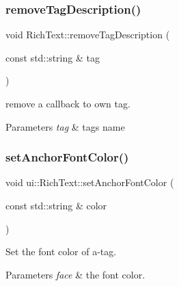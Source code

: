 \subsubsection{\texorpdfstring{remove\+Tag\+Description()}{removeTagDescription()}\hspace{0.1cm}{\footnotesize\ttfamily [2/2]}}
{\footnotesize\ttfamily void Rich\+Text\+::remove\+Tag\+Description (\begin{DoxyParamCaption}\item[{const std\+::string \&}]{tag }\end{DoxyParamCaption})\hspace{0.3cm}{\ttfamily [static]}}



remove a callback to own tag. 


\begin{DoxyParams}{Parameters}
{\em tag} & tag\textquotesingle{}s name \\
\hline
\end{DoxyParams}
\mbox{\label{classui_1_1RichText_a60ebf6b715a3c538ce8a4c77c979b305}} 
\subsubsection{\texorpdfstring{set\+Anchor\+Font\+Color()}{setAnchorFontColor()}\hspace{0.1cm}{\footnotesize\ttfamily [1/2]}}
{\footnotesize\ttfamily void ui\+::\+Rich\+Text\+::set\+Anchor\+Font\+Color (\begin{DoxyParamCaption}\item[{const std\+::string \&}]{color }\end{DoxyParamCaption})}

Set the font color of a-\/tag. 
\begin{DoxyParams}{Parameters}
{\em face} & the font color. \\
\hline
\end{DoxyParams}
\mbox{\label{classui_1_1RichText_ab5765e7b72e36140f923a34a3e891536}} 
